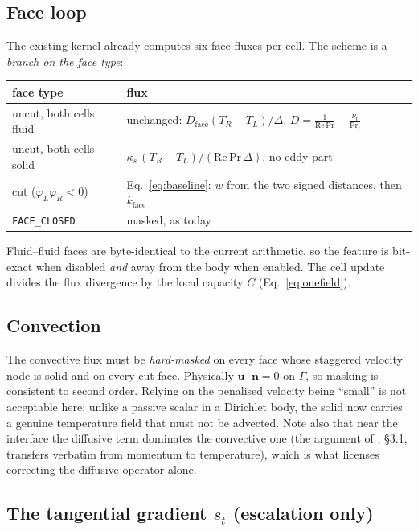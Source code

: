 \documentclass[11pt,a4paper]{article}
\newcommand{\nn}{\boldsymbol{n}}
\newcommand{\code}[1]{\texttt{#1}}
\begin{document}
\subsection{Face loop}

The existing kernel already computes six face fluxes per cell. The scheme is a
\emph{branch on the face type}:

\begin{center}
\begin{tabular}{@{}ll@{}}
\toprule
face type & flux \\
\midrule
uncut, both cells fluid & unchanged: $D_{\text{face}}(T_R-T_L)/\Delta$,
                          $D=\tfrac{1}{\mathrm{Re}\,\mathrm{Pr}}+\tfrac{\nu_t}{\mathrm{Pr}_t}$\\
uncut, both cells solid & $\kappa_s\,(T_R-T_L)/(\mathrm{Re}\,\mathrm{Pr}\,\Delta)$, no eddy part\\
cut ($\varphi_L\varphi_R<0$) & Eq.~\eqref{eq:baseline}: $w$ from the two signed
                          distances, then $k_{\text{face}}$ \\
\code{FACE\_CLOSED}     & masked, as today\\
\bottomrule
\end{tabular}
\end{center}

Fluid--fluid faces are byte-identical to the current arithmetic, so the feature
is bit-exact when disabled \emph{and} away from the body when enabled. The cell
update divides the flux divergence by the local capacity $C$
(Eq.~\eqref{eq:onefield}).

\subsection{Convection}

The convective flux must be \emph{hard-masked} on every face whose staggered
velocity node is solid and on every cut face. Physically $\boldsymbol{u}\cdot\nn=0$
on $\Gamma$, so masking is consistent to second order. Relying on the penalised
velocity being ``small'' is not acceptable here: unlike a passive scalar in a
Dirichlet body, the solid now carries a genuine temperature field that must not
be advected. Note also that near the interface the diffusive term dominates the
convective one (the argument of \cite{luchini2025}, \S3.1, transfers verbatim
from momentum to temperature), which is what licenses correcting the diffusive
operator alone.

\subsection{The tangential gradient $s_t$ (escalation only)}
\end{document}
